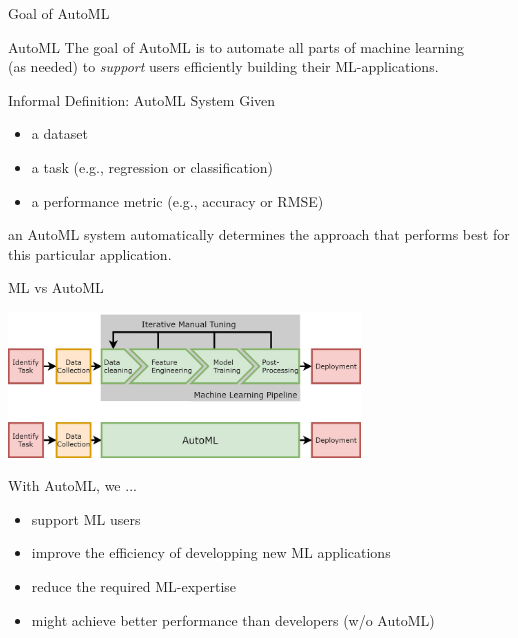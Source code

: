 \begin{frame}[c]{Goal of AutoML}

\begin{block}{AutoML}
The goal of AutoML is to automate all parts of machine learning\\ (as needed)
to \emph{support} users efficiently building their ML-applications.
\end{block}

\bigskip
\pause

\begin{block}{Informal Definition: AutoML System}
Given
\begin{itemize}
  \item a dataset
  \item a task (e.g., regression or classification)
  \item a performance metric (e.g., accuracy or RMSE)
\end{itemize}
an AutoML system automatically determines the approach 
that performs best for this particular application.
\end{block}

\end{frame}
\begin{frame}[c]{ML vs AutoML}

\begin{center}
\includegraphics[width=0.7\textwidth]{images/AutoMLPipeline.jpg}
\end{center}

\bigskip
With AutoML, we ...
\begin{itemize}
	\item support ML users
	\item improve the efficiency of developping new ML applications
	\item reduce the required ML-expertise 
	\item might achieve better performance than developers (w/o AutoML)
\end{itemize}

\end{frame}
